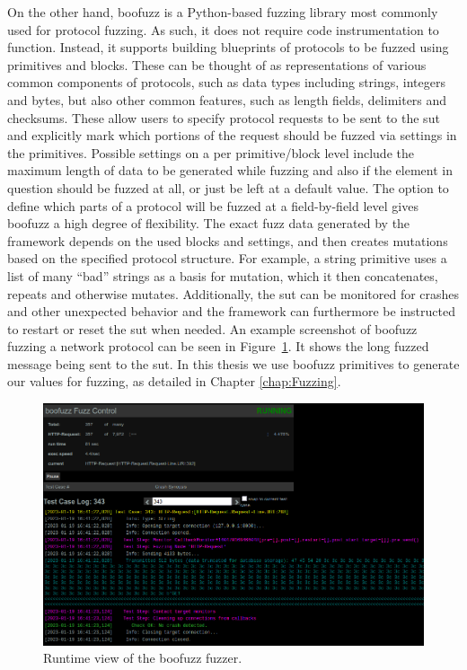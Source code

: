 \vspace{3mm}
On the other hand, boofuzz is a Python-based fuzzing library most commonly used for protocol fuzzing. As such, it does not require code instrumentation to function. Instead, it supports building blueprints of protocols to be fuzzed using primitives and blocks. These can be thought of as representations of various common components of protocols, such as data types including strings, integers and bytes, but also other common features, such as length fields, delimiters and checksums. These allow users to specify protocol requests to be sent to the \ac{sut} and explicitly mark which portions of the request should be fuzzed via settings in the primitives. Possible settings on a per primitive/block level include the maximum length of data to be generated while fuzzing and also if the element in question should be fuzzed at all, or just be left at a default value. The option to define which parts of a protocol will be fuzzed at a field-by-field level gives boofuzz a high degree of flexibility. The exact fuzz data generated by the framework depends on the used blocks and settings, and then creates mutations based on the specified protocol structure. For example, a string primitive uses a list of many ``bad'' strings as a basis for mutation, which it then concatenates, repeats and otherwise mutates. Additionally, the \ac{sut} can be monitored for crashes and other unexpected behavior and the framework can furthermore be instructed to restart or reset the \ac{sut} when needed. An example screenshot of boofuzz fuzzing a network protocol can be seen in Figure~\ref{fig:boofuzzcontrolcenter}. It shows the long fuzzed message being sent to the \ac{sut}. In this thesis we use boofuzz primitives to generate our values for fuzzing, as detailed in Chapter \ref{chap:Fuzzing}.

\begin{figure}[h]
	\centering
	\includegraphics[width=0.9\linewidth]{images/boofuzz_control_center}
	\caption{Runtime view of the boofuzz fuzzer.}
	\label{fig:boofuzzcontrolcenter}
\end{figure}

